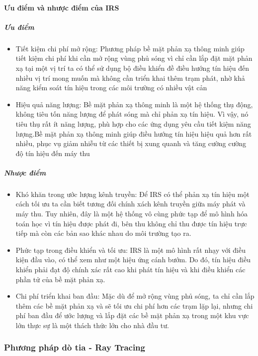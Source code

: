 \documentclass{article}
\begin{document}
\paragraph{Ưu điểm và nhược điểm của IRS}
\subparagraph{Ưu điểm}
\begin{itemize}
    \item Tiết kiệm chi phí mở rộng: 
    Phương pháp bề mặt phản xạ thông minh giúp tiết kiệm chi phí khi cần mở rộng vùng phủ sóng vì chỉ cần lắp đặt mặt phản xạ tại một vị trí ta có thể sử dụng bộ điều khiển đề điều hướng tín hiệu đến nhiều vị trí mong muốn mà không cần triển khai thêm trạm phát, nhờ khả năng kiểm soát tín hiệu trong các môi trường có nhiều vật cản
    \item Hiệu quả năng lượng:
    Bề mặt phản xạ thông minh là một hệ thống thụ động, không tiêu tốn năng lượng để phát sóng mà chỉ phản xạ tín hiệu. Vì vậy, nó tiêu thụ rất ít năng lượng, phù hợp cho các ứng dụng yêu cầu tiết kiệm năng lượng.Bề mặt phản xạ thông minh giúp điều hướng tín hiệu hiệu quả hơn rất nhiều, phục vụ giảm nhiễu từ các thiết bị xung quanh và tăng cường cường độ tín hiệu đến máy thu
\end{itemize}
\subparagraph{Nhược điểm}
\begin{itemize}
    \item Khó khăn trong ước lượng kênh truyền: 
    Để IRS có thể phản xạ tín hiệu một cách tối ưu ta cần biết tương đối chính xách kênh truyền giữa máy phát và máy thu. Tuy nhiên, đây là một hệ thống vô cùng phức tạp để mô hình hóa toán học vì tín hiệu được phát đi, bên thu không chỉ thu được tín hiệu trực tiếp mà còn các bản sao khác nhau do môi trường tạo ra.
    \item Phức tạp trong điều khiển và tối ưu:
    IRS là một mô hình rất nhạy với điều kiện đầu vào, có thể xem như một hiệu ứng cánh bướm. Do đó, tín hiệu điều khiển phải đạt độ chính xác rất cao khi phát tín hiệu và khi điều khiển các phần tử của bề mặt phản xạ.
    \item Chi phí triển khai ban đầu:
    Mặc dù để mở rộng vùng phủ sóng, ta chỉ cần lắp thêm các bề mặt phản xạ và sẽ tối ưu chi phí hơn các trạm lặp lại, nhưng chi phí ban đầu để ước lượng và lắp đặt các bề mặt phản xạ trong một khu vực lớn thực sự là một thách thức lớn cho nhà đầu tư.
\end{itemize}

\subsubsection{Phương pháp dò tia - Ray Tracing}
\end{document}
